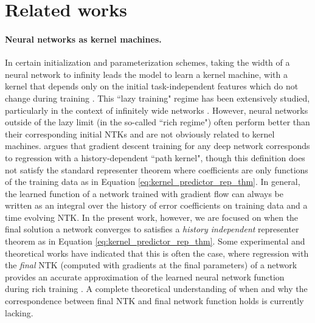 \section{Related works}
\vspace{-5pt}
\paragraph{Neural networks as kernel machines.} 

In certain initialization and parameterization schemes, taking the width of a neural network to infinity leads the model to learn a kernel machine, with a kernel that depends only on the initial task-independent features which do not change during training \cite{jacot2020neuraltangentkernelconvergence, lee2018deepneuralnetworksgaussian}.
This ``lazy training" regime has been extensively studied, particularly in the context of infinitely wide networks \cite{chizat2020lazytrainingdifferentiableprogramming, jacot2020neuraltangentkernelconvergence, lee2018deepneuralnetworksgaussian, Lee_2020}. However, neural networks outside of the lazy limit (in the so-called ``rich regime") often perform better than their corresponding initial NTKs \cite{vyas2022limitations} and are not obviously related to kernel machines. \citet{domingos2020every} argues that gradient descent training for any deep network corresponds to regression with a history-dependent ``path kernel", though this definition does not satisfy the standard representer theorem where coefficients are only functions of the training data as in Equation \eqref{eq:kernel_predictor_rep_thm}. In general, the learned function of a network trained with gradient flow can always be written as an integral over the history of error coefficients on training data and a time evolving NTK. In the present work, however, we are focused on when the final solution a network converges to satisfies a \textit{history independent} representer theorem as in Equation \ref{eq:kernel_predictor_rep_thm}. Some experimental and theoretical works have indicated that this is often the case, where regression with the \textit{final} NTK (computed with gradients at the final parameters) of a network provides an accurate approximation of the learned neural network function during rich training \cite{Geiger_2020, atanasov2021neuralnetworkskernellearners, wei2022toyrandommatrixmodels}. A complete theoretical understanding of when and why the correspondence between final NTK and final network function holds is currently lacking.

